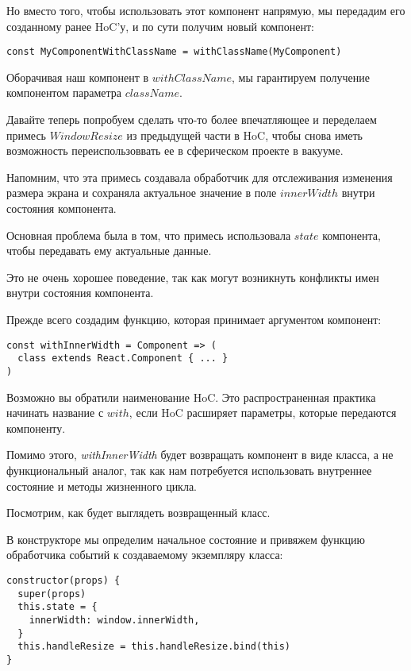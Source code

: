 Но вместо того, чтобы использовать этот компонент напрямую, мы передадим его созданному ранее HoC'у, и по сути получим новый компонент:

\begin{lstlisting}
const MyComponentWithClassName = withClassName(MyComponent)
\end{lstlisting}

Оборачивая наш компонент в $withClassName$, мы гарантируем получение компонентом параметра $className$.

Давайте теперь попробуем сделать что-то более впечатляющее и переделаем примесь $WindowResize$ из предыдущей части в HoC, чтобы снова иметь возможность переиспользоввать ее в сферическом проекте в вакууме.

Напомним, что эта примесь создавала обработчик для отслеживания изменения размера экрана и сохраняла актуальное значение в поле $innerWidth$ внутри состояния компонента.

Основная проблема была в том, что примесь использовала $state$ компонента, чтобы передавать ему актуальные данные.

Это не очень хорошее поведение, так как могут возникнуть конфликты имен внутри состояния компонента.

Прежде всего создадим функцию, которая принимает аргументом компонент:

\begin{lstlisting}
const withInnerWidth = Component => (
  class extends React.Component { ... }
)
\end{lstlisting}

Возможно вы обратили наименование HoC. Это распространенная практика начинать название с $with$, если HoC расширяет параметры, которые передаются компоненту.

Помимо этого, \textit{withInnerWidth} будет возвращать компонент в виде класса, а не функциональный аналог, так как нам потребуется использовать внутреннее состояние и методы жизненного цикла.

Посмотрим, как будет выглядеть возвращенный класс.

В конструкторе мы определим начальное состояние и привяжем функцию обработчика событий к создаваемому экземпляру класса:

\begin{lstlisting}
constructor(props) {
  super(props)
  this.state = {
    innerWidth: window.innerWidth,
  }
  this.handleResize = this.handleResize.bind(this)
}
\end{lstlisting}


